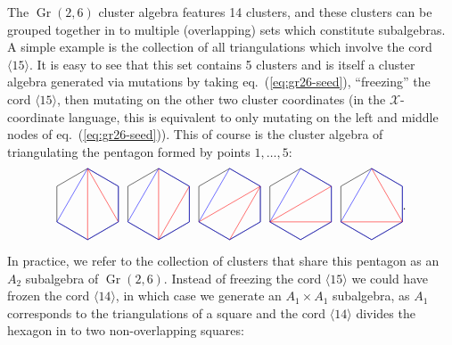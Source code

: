 \documentclass[11pt]{article}
\DeclareMathOperator{\Gr}{Gr}
\def\ket#1{\langle #1 \rangle}
\def\xcoord{$\mathcal{X}$-coordinate }
\def\drawHexagon{
\coordinate (P1) at (90:1);
\coordinate (P2) at (30:1);
\coordinate (P3) at (330:1);
\coordinate (P4) at (270:1);
\coordinate (P5) at (210:1);
\coordinate (P6) at (150:1);
\draw (P1) -- (P2) -- (P3) -- (P4) -- (P5) -- (P6) -- cycle;
}
\begin{document}
The $\Gr(2,6)$ cluster algebra features 14 clusters, and these clusters can be grouped together in to multiple (overlapping) sets which constitute subalgebras. A simple example is the collection of all triangulations which involve the cord $\ket{15}$. It is easy to see that this set contains 5 clusters and is itself a cluster algebra generated via mutations by taking eq.~(\ref{eq:gr26-seed}), ``freezing'' the cord $\ket{15}$, then mutating on the other two cluster coordinates (in the \xcoord language, this is equivalent to only mutating on the left and middle nodes of eq.~(\ref{eq:gr26-seed})). This of course is the cluster algebra of triangulating the pentagon formed by points $1,\ldots,5$:
\begin{equation}
\begin{gathered}
\begin{tikzpicture}
	\drawHexagon
  	\draw[color=red] (P1) -- (P3);
  	\draw[color=red] (P1) -- (P4);
	\draw[color=blue] (P1) -- (P2) -- (P3) -- (P4) -- (P5) -- cycle;
	\begin{scope}[xshift=2cm]
	\drawHexagon
  	\draw[color=red] (P2) -- (P4);
  	\draw[color=red] (P1) -- (P4);
	\draw[color=blue] (P1) -- (P2) -- (P3) -- (P4) -- (P5) -- cycle;
	\end{scope}
	\begin{scope}[xshift=4cm]
	\drawHexagon
  	\draw[color=red] (P2) -- (P4);
  	\draw[color=red] (P2) -- (P5);
	\draw[color=blue] (P1) -- (P2) -- (P3) -- (P4) -- (P5) -- cycle;
	\end{scope}
	\begin{scope}[xshift=6cm]
	\drawHexagon
  	\draw[color=red] (P2) -- (P5);
  	\draw[color=red] (P3) -- (P5);
	\draw[color=blue] (P1) -- (P2) -- (P3) -- (P4) -- (P5) -- cycle;
	\end{scope}
	\begin{scope}[xshift=8cm]
	\drawHexagon
  	\draw[color=red] (P1) -- (P3);
  	\draw[color=red] (P3) -- (P5);
	\draw[color=blue] (P1) -- (P2) -- (P3) -- (P4) -- (P5) -- cycle;
	\end{scope}
\end{tikzpicture}
\end{gathered}.
\end{equation}
In practice, we refer to the collection of clusters that share this pentagon as an $A_2$ subalgebra of $\Gr(2,6)$. Instead of freezing the cord $\ket{15}$ we could have frozen the cord $\ket{14}$, in which case we generate an $A_1 \times A_1$ subalgebra, as $A_1$ corresponds to the triangulations of a square and the cord $\ket{14}$ divides the hexagon in to two non-overlapping squares:
\end{document}
